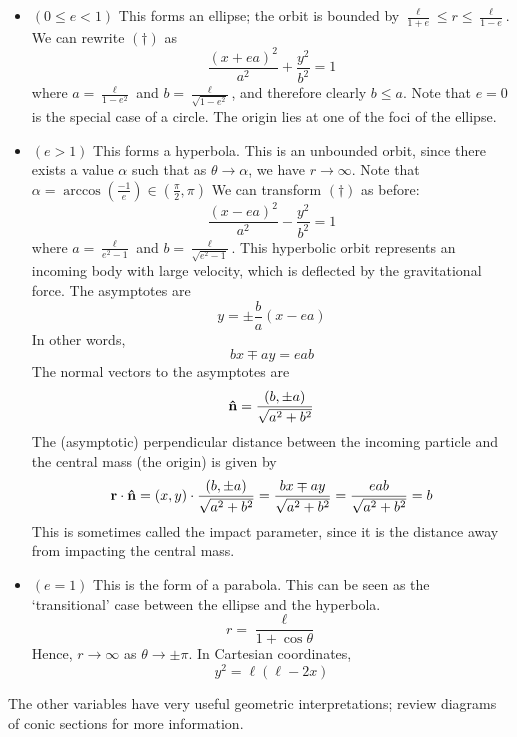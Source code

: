 \begin{itemize}
	\item \((0 \leq e < 1)\) This forms an ellipse; the orbit is bounded by \(\frac{\ell}{1+e} \leq r \leq \frac{\ell}{1 - e}\).
	      We can rewrite \((\dagger)\) as
	      \[
		      \frac{(x+ea)^2}{a^2} + \frac{y^2}{b^2} = 1
	      \]
	      where \(a = \frac{\ell}{1 - e^2}\) and \(b = \frac{\ell}{\sqrt{1-e^2}}\), and therefore clearly \(b \leq a\).
	      Note that \(e=0\) is the special case of a circle.
	      The origin lies at one of the foci of the ellipse.
	\item \((e > 1)\) This forms a hyperbola.
	      This is an unbounded orbit, since there exists a value \(\alpha\) such that as \(\theta \to \alpha\), we have \(r \to \infty\).
	      Note that \(\alpha = \arccos(\frac{-1}{e}) \in \left(\frac{\pi}{2}, \pi\right)\) We can transform \((\dagger)\) as before:
	      \[
		      \frac{(x-ea)^2}{a^2} - \frac{y^2}{b^2} = 1
	      \]
	      where \(a = \frac{\ell}{e^2 - 1}\) and \(b = \frac{\ell}{\sqrt{e^2 - 1}}\).
	      This hyperbolic orbit represents an incoming body with large velocity, which is deflected by the gravitational force.
	      The asymptotes are
	      \[
		      y = \pm \frac{b}{a}(x-ea)
	      \]
	      In other words,
	      \[
		      bx \mp ay = eab
	      \]
	      The normal vectors to the asymptotes are
	      \[
		      \vu{n} = \frac{(b, \pm a)}{\sqrt{a^2 + b^2}}
	      \]
	      The (asymptotic) perpendicular distance between the incoming particle and the central mass (the origin) is given by
	      \[
		      \vb r \cdot \vu{n} = (x, y) \cdot \frac{(b, \pm a)}{\sqrt{a^2 + b^2}} = \frac{bx \mp ay}{\sqrt{a^2 + b^2}} = \frac{eab}{\sqrt{a^2 + b^2}} = b
	      \]
	      This is sometimes called the impact parameter, since it is the distance away from impacting the central mass.
	\item \((e = 1)\) This is the form of a parabola.
	      This can be seen as the `transitional' case between the ellipse and the hyperbola.
	      \[
		      r = \frac{\ell}{1 + \cos\theta}
	      \]
	      Hence, \(r \to \infty\) as \(\theta \to \pm \pi\).
	      In Cartesian coordinates,
	      \[
		      y^2 = \ell(\ell-2x)
	      \]
\end{itemize}
The other variables have very useful geometric interpretations; review diagrams of conic sections for more information.


